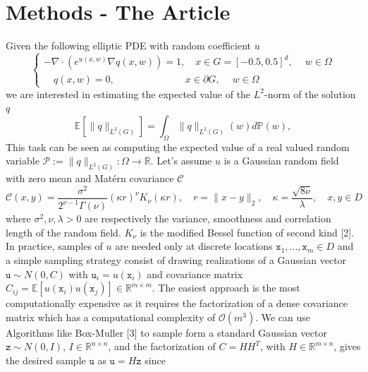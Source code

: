 \documentclass[a4paper, 11pt, oneside]{scrartcl}
\begin{document}
\section{Methods - The Article}
Given the following elliptic PDE with random coefficient \(u\)
\begin{equation}
\begin{cases}
-\nabla \cdot ( e^{u(x,w)} \nabla q(x,w) ) = 1, \quad x \in G=[-0.5,0.5]^d, \quad \ w \in \Omega \\ \quad q(x,w) = 0, \hspace{3cm} x \in \partial G, \quad \ w \in \Omega
\end{cases}
\end{equation}
we are interested in estimating the expected value of the \(L^2\)-norm of the solution \(q\)
\begin{equation}
\mathbb{E}\left[ \|q\|_{L^2(G)} \right] = \int_\Omega \|q\|_{L^2(G)}(w) d \mathbb{P}(w),
\end{equation}
This task can be seen as computing the expected value of a real valued random variable \( \mathcal{P}:= \|q\|_{L^2(G)} : \Omega \rightarrow \mathbb{R}.\) Let's assume \(u\) is a Gaussian random field with zero mean and Matérn covariance \(\mathcal{C}\)
\begin{equation}
\mathcal{C}(x,y) = \frac{\sigma^2}{2^{\nu -1} \Gamma(\nu)}(\kappa r)^\nu K_{\nu}(\kappa r), \quad r =\|x-y\|_2, \quad \kappa = \frac{ \sqrt{8 \nu} }{\lambda}, \quad x,y \in D
\end{equation} 
where \( \sigma^2, \nu, \lambda > 0\) are respectively the variance, smoothness and correlation length of the random field. \( K_{\nu}\) is the modified Bessel function of second kind [2]. \\
In practice, samples of \(u\) are needed only at discrete locations \( \texttt{x}_1, \dots , \texttt{x}_m \in D\) and a simple sampling strategy consist of drawing realizations of a Gaussian vector \( \texttt{u} \sim N(0,C) \) with \( \texttt{u}_i = u(\texttt{x}_i) \) and covariance matrix \( C_{ij}  = \mathbb{E}[u(\texttt{x}_i)u(\texttt{x}_j)] \in \mathbb{R}^{ m \times m} \).
The easiest approach is the most computationally expensive as it requires the factorization of a dense covariance matrix which has a computational complexity of \( \mathcal{O}(m^3) \). We can use Algorithms like Box-Muller [3] to sample form a standard Gaussian vector \( \mathtt{z} \sim N(0,I) \), \( I \in \mathbb{R}^{n \times n}\), and the factorization of \( C = HH^T\), with \( H \in \mathbb{R}^{ m \times n} \), gives the desired sample \( \texttt{u} \) as \( \texttt{u} = H \texttt{z} \)  since
\end{document}
